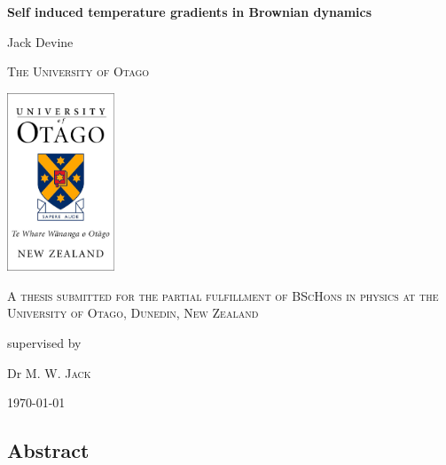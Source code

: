 \documentclass[12pt]{book} %
\begin{document}
\frontmatter
	\begin{titlepage}
		\centering
		{\huge\bfseries Self induced temperature gradients in Brownian dynamics\par}
		\vspace{1cm}
		{\huge Jack Devine\par}
		\vspace{1cm}
		{\scshape\LARGE The University of Otago \par}
		\vspace{1cm}
		\includegraphics[width=0.24\textwidth]{OtagoLogo.eps}\par\vspace{1cm}
		\vspace{1cm}
		{\scshape\Large A thesis submitted for the partial fulfillment of  BScHons in physics at the University of Otago, Dunedin, New Zealand\par}
		\vspace{2cm}
		\vfill
		supervised by\par
		Dr M. W. \textsc{Jack}

		\vfill

		{\large \today\par}
	\end{titlepage}


\newpage
%
\begin{center}
\section*{Abstract} %
\end{center}
\end{document}

